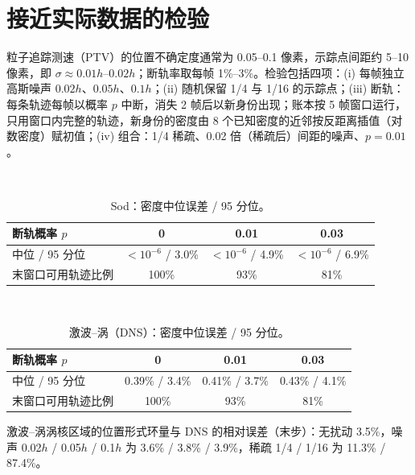 \section{接近实际数据的检验}
粒子追踪测速（PTV）的位置不确定度通常为 0.05–0.1 像素，示踪点间距约 5–10 像素，即 $\sigma\approx0.01h$–$0.02h$；断轨率取每帧 1\%–3\%。检验包括四项：(i) 每帧独立高斯噪声 $0.02h$、$0.05h$、$0.1h$；(ii) 随机保留 1/4 与 1/16 的示踪点；(iii) 断轨：每条轨迹每帧以概率 $p$ 中断，消失 2 帧后以新身份出现；账本按 5 帧窗口运行，只用窗口内完整的轨迹，新身份的密度由 8 个已知密度的近邻按反距离插值（对数密度）赋初值；(iv) 组合：1/4 稀疏、0.02 倍（稀疏后）间距的噪声、$p=0.01$。
\begin{table}[!htbp]\centering\small\caption{Sod：密度中位误差 / 95 分位。}
\\[0.3em]\begin{tabular}{lccc}\toprule 断轨概率 $p$ & 0 & 0.01 & 0.03\\\midrule
中位 / 95 分位 & $<10^{-6}$ / 3.0\% & $<10^{-6}$ / 4.9\% & $<10^{-6}$ / 6.9\%\\
末窗口可用轨迹比例 & 100\% & 93\% & 81\%\\\bottomrule\end{tabular}\end{table}
\begin{table}[!htbp]\centering\small\caption{激波–涡（DNS）：密度中位误差 / 95 分位。}
\\[0.3em]\begin{tabular}{lccc}\toprule 断轨概率 $p$ & 0 & 0.01 & 0.03\\\midrule
中位 / 95 分位 & 0.39\% / 3.4\% & 0.41\% / 3.7\% & 0.43\% / 4.1\%\\
末窗口可用轨迹比例 & 100\% & 93\% & 81\%\\\bottomrule\end{tabular}\end{table}
激波–涡涡核区域的位置形式环量与 DNS 的相对误差（末步）：无扰动 3.5\%，噪声 0.02$h$ / 0.05$h$ / 0.1$h$ 为 3.6\% / 3.8\% / 3.9\%，稀疏 1/4 / 1/16 为 11.3\% / 87.4\%。

